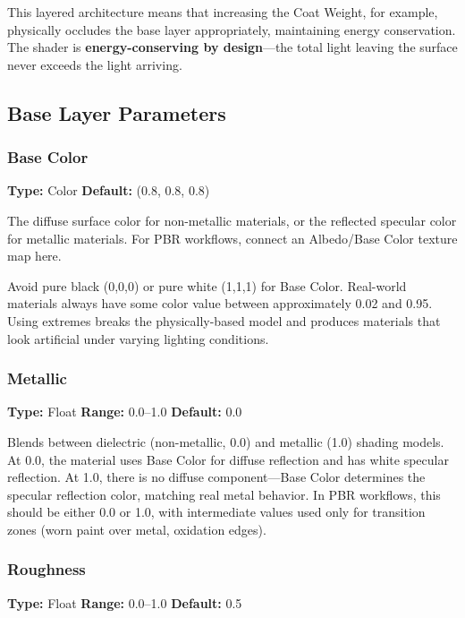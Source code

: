 This layered architecture means that increasing the Coat Weight, for
example, physically occludes the base layer appropriately,
maintaining energy conservation. The shader is
\textbf{energy-conserving by design}---the total light leaving the
surface never exceeds the light arriving.

\subsection{Base Layer Parameters}
\label{sec:shading:principled:base}

\subsubsection{Base Color}
\textbf{Type:} Color \quad \textbf{Default:} (0.8, 0.8, 0.8)

The diffuse surface color for non-metallic materials, or the
reflected specular color for metallic materials. For PBR workflows,
connect an Albedo/Base Color texture map here.

\begin{warningbox}
Avoid pure black (0,0,0) or pure white (1,1,1) for Base Color.
Real-world materials always have some color value between
approximately 0.02 and 0.95. Using extremes breaks the physically-based model and produces materials that look artificial under
varying lighting conditions.
\end{warningbox}

\subsubsection{Metallic}
\textbf{Type:} Float \quad \textbf{Range:} 0.0--1.0 \quad
\textbf{Default:} 0.0

Blends between dielectric (non-metallic, 0.0) and metallic (1.0)
shading models. At 0.0, the material uses Base Color for diffuse
reflection and has white specular reflection. At 1.0, there is no
diffuse component---Base Color determines the specular reflection
color, matching real metal behavior. In PBR workflows, this should
be either 0.0 or 1.0, with intermediate values used only for
transition zones (worn paint over metal, oxidation edges).

\subsubsection{Roughness}
\textbf{Type:} Float \quad \textbf{Range:} 0.0--1.0 \quad
\textbf{Default:} 0.5

